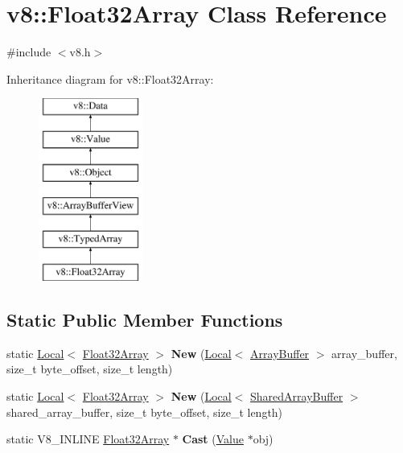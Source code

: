 \hypertarget{classv8_1_1Float32Array}{}\section{v8\+:\+:Float32\+Array Class Reference}
\label{classv8_1_1Float32Array}


{\ttfamily \#include $<$v8.\+h$>$}

Inheritance diagram for v8\+:\+:Float32\+Array\+:\begin{figure}[H]
\begin{center}
\leavevmode
\includegraphics[height=6.000000cm]{classv8_1_1Float32Array}
\end{center}
\end{figure}
\subsection*{Static Public Member Functions}
\begin{DoxyCompactItemize}
\item 
\hypertarget{classv8_1_1Float32Array_af7e2ce97268849289d8ab38fd07fbf62}{}static \hyperlink{classv8_1_1Local}{Local}$<$ \hyperlink{classv8_1_1Float32Array}{Float32\+Array} $>$ {\bfseries New} (\hyperlink{classv8_1_1Local}{Local}$<$ \hyperlink{classv8_1_1ArrayBuffer}{Array\+Buffer} $>$ array\+\_\+buffer, size\+\_\+t byte\+\_\+offset, size\+\_\+t length)\label{classv8_1_1Float32Array_af7e2ce97268849289d8ab38fd07fbf62}

\item 
\hypertarget{classv8_1_1Float32Array_af3140edf1f13845670f4e4ddd41200c3}{}static \hyperlink{classv8_1_1Local}{Local}$<$ \hyperlink{classv8_1_1Float32Array}{Float32\+Array} $>$ {\bfseries New} (\hyperlink{classv8_1_1Local}{Local}$<$ \hyperlink{classv8_1_1SharedArrayBuffer}{Shared\+Array\+Buffer} $>$ shared\+\_\+array\+\_\+buffer, size\+\_\+t byte\+\_\+offset, size\+\_\+t length)\label{classv8_1_1Float32Array_af3140edf1f13845670f4e4ddd41200c3}

\item 
\hypertarget{classv8_1_1Float32Array_adf926d03cacd4b3901d7f9750671a350}{}static V8\+\_\+\+I\+N\+L\+I\+N\+E \hyperlink{classv8_1_1Float32Array}{Float32\+Array} $\ast$ {\bfseries Cast} (\hyperlink{classv8_1_1Value}{Value} $\ast$obj)\label{classv8_1_1Float32Array_adf926d03cacd4b3901d7f9750671a350}

\end{DoxyCompactItemize}
